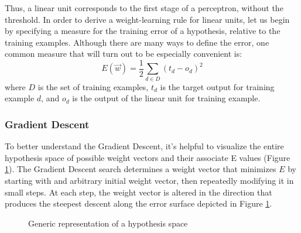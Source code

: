 \documentclass{article}
\begin{document}
Thus, a linear unit corresponds to the first stage of a perceptron, without the threshold.
In order to derive a weight-learning rule for linear units, let us begin by specifying a measure for the training error of a hypothesis, relative to the training examples. Although there are many ways to define the error, one common measure that will turn out to be especially convenient is:
\begin{equation} \label{eq:7}
    E(\Vec{w}) = \frac{1}{2}\sum_{d\in D} (t_d - o_d)^2
\end{equation}
where $D$ is the set of training examples, $t_d$ is the target output for training example $d$, and $o_d$ is the output of the linear unit for training example. 

\subsubsection{Gradient Descent}

To better understand the Gradient Descent, it's helpful to visualize the entire hypothesis space of possible weight vectors and their associate E values (Figure \ref{fig:GD}). The Gradient Descent search determines a weight vector that minimizes $E$ by starting with and arbitrary initial weight vector, then repeatedly modifying it in small steps. At each step, the weight vector is altered in the direction that produces the steepest descent along the error surface depicted in Figure \ref{fig:GD}. 

\begin{figure}
\centering
{}
\caption{Generic representation of a hypothesis space}
\label{fig:GD}
\end{figure}
\end{document}
